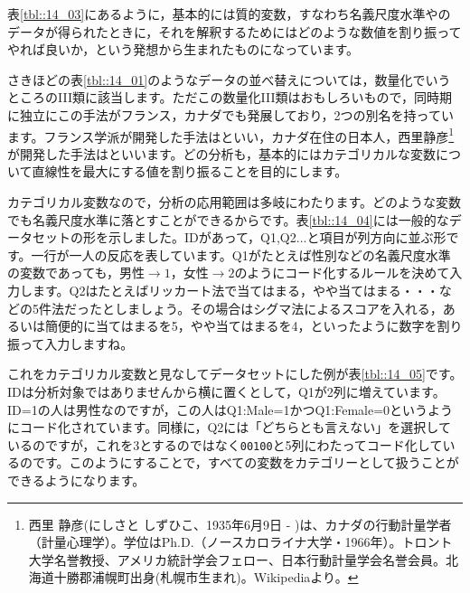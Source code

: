 \documentclass{ltjsbook}
\begin{document}
表\ref{tbl::14_03}にあるように，基本的には質的変数，すなわち名義尺度水準やのデータが得られたときに，それを解釈するためにはどのような数値を割り振ってやれば良いか，という発想から生まれたものになっています。

さきほどの表\ref{tbl::14_01}のようなデータの並べ替えについては，数量化でいうところのIII類に該当します。ただこの数量化III類はおもしろいもので，同時期に独立にこの手法がフランス，カナダでも発展しており，2つの別名を持っています。フランス学派が開発した手法はといい，カナダ在住の日本人，西里静彦\footnote{西里 静彦(にしさと しずひこ、1935年6月9日 - )は、カナダの行動計量学者（計量心理学）。学位はPh.D.（ノースカロライナ大学・1966年）。トロント大学名誉教授、アメリカ統計学会フェロー、日本行動計量学会名誉会員。北海道十勝郡浦幌町出身(札幌市生まれ)。Wikipediaより。}が開発した手法はといいます。どの分析も，基本的にはカテゴリカルな変数について直線性を最大にする値を割り振ることを目的にします。

カテゴリカル変数なので，分析の応用範囲は多岐にわたります。どのような変数でも名義尺度水準に落とすことができるからです。表\ref{tbl::14_04}には一般的なデータセットの形を示しました。IDがあって，Q1,Q2...と項目が列方向に並ぶ形です。一行が一人の反応を表しています。Q1がたとえば性別などの名義尺度水準の変数であっても，男性$\to1$，女性$\to2$のようにコード化するルールを決めて入力します。Q2はたとえばリッカート法で当てはまる，やや当てはまる・・・などの5件法だったとしましょう。その場合はシグマ法によるスコアを入れる，あるいは簡便的に当てはまるを5，やや当てはまるを4，といったように数字を割り振って入力しますね。

これをカテゴリカル変数と見なしてデータセットにした例が表\ref{tbl::14_05}です。IDは分析対象ではありませんから横に置くとして，Q1が2列に増えています。ID=1の人は男性なのですが，この人はQ1:Male=1かつQ1:Female=0というようにコード化されています。同様に，Q2には「どちらとも言えない」を選択しているのですが，これを3とするのではなく\texttt{00100}と5列にわたってコード化しているのです。このようにすることで，すべての変数をカテゴリーとして扱うことができるようになります。
\end{document}
